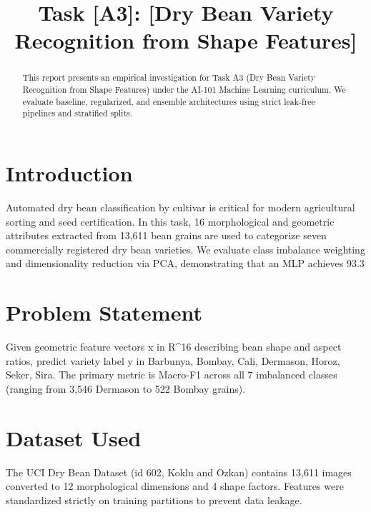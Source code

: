 \documentclass[conference]{IEEEtran}
\begin{document}
\title{Task [A3]: [Dry Bean Variety Recognition from Shape Features]}

\author{
}

\maketitle

\begin{abstract}
This report presents an empirical investigation for Task A3 (Dry Bean Variety Recognition from Shape Features) under the AI-101 Machine Learning curriculum. We evaluate baseline, regularized, and ensemble architectures using strict leak-free pipelines and stratified splits.
\end{abstract}

\section{Introduction}
Automated dry bean classification by cultivar is critical for modern agricultural sorting and seed certification. In this task, 16 morphological and geometric attributes extracted from 13,611 bean grains are used to categorize seven commercially registered dry bean varieties. We evaluate class imbalance weighting and dimensionality reduction via PCA, demonstrating that an MLP achieves 93.3%

\section{Problem Statement}
Given geometric feature vectors x in R^16 describing bean shape and aspect ratios, predict variety label y in {Barbunya, Bombay, Cali, Dermason, Horoz, Seker, Sira}. The primary metric is Macro-F1 across all 7 imbalanced classes (ranging from 3,546 Dermason to 522 Bombay grains).

\section{Dataset Used}
The UCI Dry Bean Dataset (id 602, Koklu and Ozkan) contains 13,611 images converted to 12 morphological dimensions and 4 shape factors. Features were standardized strictly on training partitions to prevent data leakage.
\end{document}
